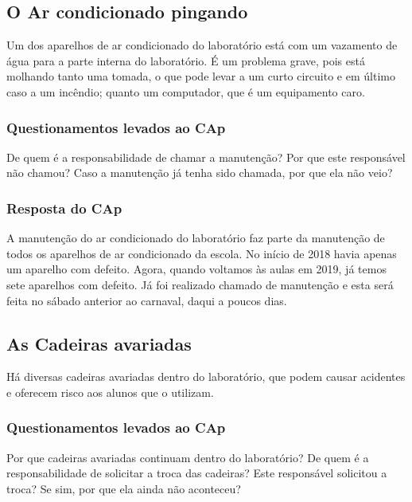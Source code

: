 \subsection{O Ar condicionado pingando}\label{sec:LABEL_CHP_REL_SEC_PROBS_SUBSEC_AC}

Um dos aparelhos de ar condicionado do laboratório está com um vazamento de água para a parte interna do laboratório. É um problema grave, pois está molhando tanto uma tomada, o que pode levar a um curto circuito e em último caso a um incêndio; quanto um computador, que é um equipamento caro.

\subsubsection{Questionamentos levados ao CAp}

De quem é a responsabilidade de chamar a manutenção? Por que este responsável não chamou? Caso a manutenção já tenha sido chamada, por que ela não veio?

\subsubsection{Resposta do CAp}

A manutenção do ar condicionado do laboratório faz parte da manutenção de todos os aparelhos de ar condicionado da escola. No início de 2018 havia apenas um aparelho com defeito. Agora, quando voltamos às aulas em 2019, já temos sete aparelhos com defeito. Já foi realizado chamado de manutenção e esta será feita no sábado anterior ao carnaval, daqui a poucos dias.

\subsection{As Cadeiras avariadas}\label{sec:LABEL_CHP_REL_SEC_PROBS_SUBSEC_CAD}

Há diversas cadeiras avariadas dentro do laboratório, que podem causar acidentes e oferecem risco aos alunos que o utilizam.

\subsubsection{Questionamentos levados ao CAp}

Por que cadeiras avariadas continuam dentro do laboratório? De quem é a responsabilidade de solicitar a troca das cadeiras? Este responsável solicitou a troca? Se sim, por que ela ainda não aconteceu?

